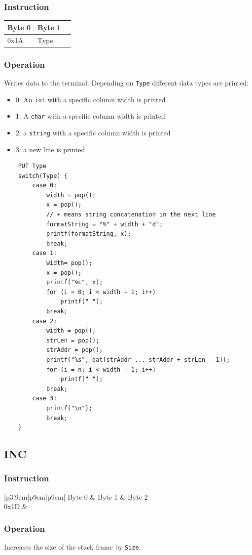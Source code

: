 \documentclass[11pt]{report}
\newcommand{\twobyteinstruction}[2]{
\begin{tabular}{|p{3.9em}|p{9em}|p{9em}|}
\hline
\tiny{Byte 0} & \tiny{Byte 1} \\ \hline
#1 & #2 \\ \hline
\end{tabular}
}
\newcommand{\threebyteinstruction}[2]{
\begin{tabular}{|p{3.9em}|p{9em}|p{9em}|}
\hline
\tiny{Byte 0} & \tiny{Byte 1} & \tiny{Byte 2} \\ \hline
#1 & \multicolumn{2}{c |}{#2} \\ \hline
\end{tabular}
}
\begin{document}
\subsubsection{Instruction}
\twobyteinstruction{0x1A}{Type}

\subsubsection{Operation}
Writes data to the terminal. Depending on \lstinline$Type$ different data types are printed:

\begin{itemize}
	\item 0: An \lstinline$int$ with a specific column width is printed
	\item 1: A \lstinline$char$ with a specific column width is printed
	\item 2: a \lstinline$string$ with a specific column width is printed
	\item 3: a new line is printed
\end{itemize}

	\begin{lstlisting}
	PUT Type
	switch(Type) {
		case 0:
			width = pop();
			x = pop();
			// + means string concatenation in the next line
			formatString = "%" + width + "d";
			printf(formatString, x);
			break;
		case 1:
			width= pop();
			x = pop();
			printf("%c", x);
			for (i = 0; i < width - 1; i++)
				printf(" ");
			break;
		case 2:
			width = pop();
			strLen = pop();
			strAddr = pop();
			printf("%s", dat[strAddr ... strAddr + strLen - 1]);
			for (i = n; i < width - 1; i++)
				printf(" ");
			break;
		case 3:
			printf("\n");
			break;
	}
	\end{lstlisting}

\subsection{INC}
\subsubsection{Instruction}
\threebyteinstruction{0x1D}{Size}

\subsubsection{Operation}
Increases the size of the stack frame by \lstinline$Size$.
\end{document}
